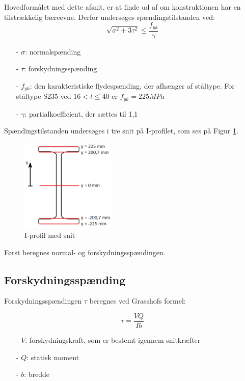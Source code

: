 Hovedformålet med dette afsnit, er at finde ud af om konstruktionen har en tilstrækkelig bæreevne. Derfor undersøges spændingstilstanden ved: 
\begin{equation}
	\sqrt{\sigma^2 + 3\tau^2} \le \frac{f_{yk}}{\gamma}
\end{equation}

\begin{itemize}
	\item[-] $\sigma$: normalspænding 
	\item[-] $\tau$: forskydningsspænding
	\item[-] $f_{yk}$: den karakteristiske flydespænding, der afhænger af ståltype. For ståltype S235 ved $16 < t \le 40$ er $f_{yk} = 225 MPa$ \citep[ s. 213]{stabi}
	\item[-] $\gamma$: partialkoefficient, der sættes til 1,1 \citep[ s. 212]{stabi}
\end{itemize}

Spændingstilstanden undersøges i tre snit på I-profilet, som ses på Figur \ref{fig:iprofilsnit}.

\begin{figure}[H]
	\centering
	\includegraphics[width=0.4\textwidth]{billeder/iprofilsnit.png}
	\caption{I-profil med snit}
	\label{fig:iprofilsnit}
\end{figure}

Først beregnes normal- og forskydningsspændingen. 

\subsection{Forskydningsspænding}
Forskydningsspændingen $\tau$ beregnes ved Grasshofs formel:

\begin{equation}
\tau = \frac{VQ}{Ib}
\end{equation}

\begin{itemize}
	\item[-] $V$: forskydningskraft, som er bestemt igennem snitkræfter
	\item[-] $Q$: statisk moment
	\item[-] $b$: bredde
\end{itemize}

